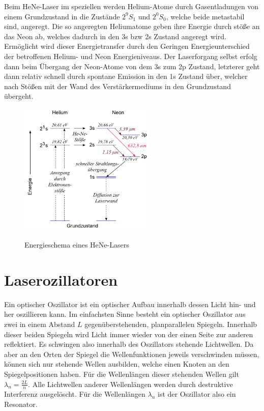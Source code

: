 \documentclass[bigchapter,colorback,accentcolor=tud4b,linedtoc,11pt]{tudreport}
\numberwithin{equation}{subsection}
\begin{document}
Beim HeNe-Laser im speziellen werden Helium-Atome durch Gasentladungen von einem Grundzustand in die Zustände $2^{9}S_{1}$ und $2^{0}S_{0}$, welche beide metastabil sind, angeregt. Die so angeregten Heliumatome geben ihre Energie durch stöße an das Neon ab, welches dadurch in den 3s bzw 2s Zustand angeregt wird. Ermöglicht wird dieser Energietransfer durch den Geringen Energieunterschied der betroffenen Helium- und Neon Energieniveaus. Der Laserforgang selbst erfolg dann beim Übergang der Neon-Atome von dem 3s zum 2p Zustand, letzterer geht dann relativ schnell durch spontane Emission in den 1s Zustand über, welcher nach Stößen mit der Wand des Verstärkermediums in den Grundzustand übergeht.

\begin{figure}[ht!]
\centering
\includegraphics[width=65mm]{img/5074.png}
\caption{Energieschema eines HeNe-Lasers}
\label{HeNeLaser}
\cite{HeNeNiveaus}
\end{figure}
\section{Laserozillatoren}
Ein optischer Oszillator ist ein optischer Aufbau innerhalb dessen Licht hin- und her oszillieren kann. Im einfachsten Sinne besteht ein optischer Oszillator aus zwei in einem Abstand \(L\) gegenüberstehenden, planparallelen Spiegeln. Innerhalb dieser beiden Spiegeln wird Licht immer wieder von der einen Seite zur anderen reflektiert. Es schwingen also innerhalb des Oszillators stehende Lichtwellen. Da aber an den Orten der Spiegel die Wellenfunktionen jeweils verschwinden müssen, können sich nur stehende Wellen ausbilden, welche einen Knoten an den Spiegelpositionen haben. Für die Wellenlängen dieser stehenden Wellen gilt \(\lambda_n = \frac{2L}{n}\). Alle Lichtwellen anderer Wellenlängen werden durch destruktive Interferenz ausgelöscht. Für die Wellenlängen \(\lambda_n\) ist der Oszillator also ein Resonator.
\end{document}
